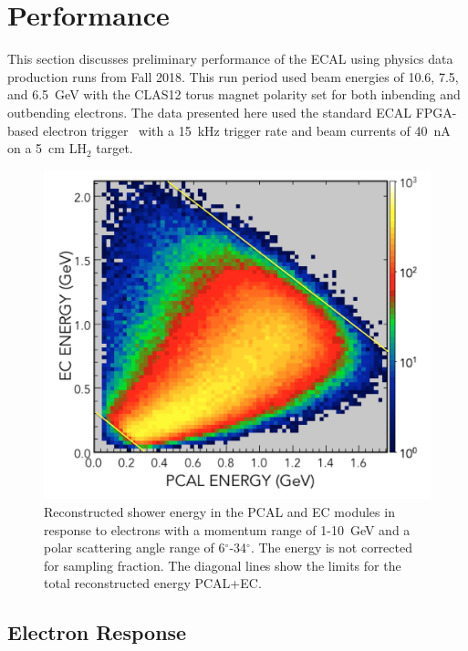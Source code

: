 \section{Performance}
\label{Performance}

This section discusses preliminary performance of the ECAL using physics data production runs from Fall 2018.
This run period used beam energies of 10.6, 7.5, and 6.5~GeV with the CLAS12 torus magnet polarity set for both
inbending and outbending electrons. The data presented here used the standard ECAL FPGA-based electron
trigger~\cite{nim:trig} with a 15~kHz trigger rate and beam currents of 40~nA on a 5~cm LH$_2$ target.

\begin{figure}[t]
\centering
\includegraphics[width=0.8\columnwidth,keepaspectratio]{img/S10_1_000.png}
\caption[]{Reconstructed shower energy in the PCAL and EC modules in response to electrons with a momentum
  range of 1-10~GeV and a polar scattering angle range of 6$^\circ$-34$^\circ$. The energy is not corrected for
  sampling fraction. The diagonal lines show the limits for the total reconstructed energy PCAL+EC.}
\label{fig:S10_1_000}
\end{figure}

\subsection{Electron Response}

